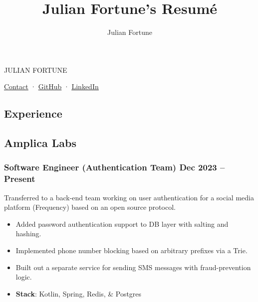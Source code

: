 \documentclass[10pt]{article} %
\title{Julian Fortune's Resumé}
\author{Julian Fortune}
\providecommand{\tightlist}{%
  \setlength{\itemsep}{0pt}\setlength{\parskip}{0pt}}
\let\defaultref\href
\renewcommand{\href}[2]{%
  \defaultref{#1}{\ul{#2}}%
}
\newcommand{\link}[2]{\href{#1}{#2}}
\def\separator{ · {}}
\begin{document}
\begin{bfseries}\begin{huge}
  {\selectfont%
    \MakeTextUppercase{Julian Fortune}
  }
\end{huge}\end{bfseries}

  \link{https://forms.gle/KkSirNbEgQozTH2x7}{Contact}\separator%
    \link{http://github.com/julianfortune}{GitHub}\separator%
\link{http://linkedin.com/in/julianfortune}{LinkedIn}%


\begin{paracol}{2}
\setlength{\columnsep}{1em}

\hypertarget{experience}{%
\section{Experience}\label{experience}}

\hypertarget{amplica-labs}{%
\subsection{Amplica Labs}\label{amplica-labs}}

\vspace{-5pt}

\hypertarget{software-engineer-authentication-team-dec-2023-present}{%
\subsubsection{\texorpdfstring{\small Software Engineer (Authentication
Team) \hfill Dec 2023 --
Present}{Software Engineer (Authentication Team) Dec 2023 -- Present}}\label{software-engineer-authentication-team-dec-2023-present}}

Transferred to a back-end team working on user authentication for a
social media platform (Frequency) based on an open source protocol.

\begin{itemize}
\tightlist
\item
  Added password authentication support to DB layer with salting and
  hashing.
\item
  Implemented phone number blocking based on arbitrary prefixes via a
  Trie.
\item
  Built out a separate service for sending SMS messages with
  fraud-prevention logic.
\item
  \textbf{Stack}: Kotlin, Spring, Redis, \& Postgres
\end{itemize}


\end{paracol}
\end{document}
